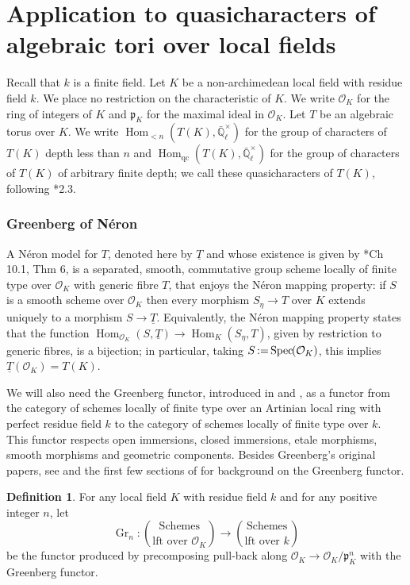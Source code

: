 \documentclass[11pt]{amsart}
\theoremstyle{plain}
\theoremstyle{definition}
\newtheorem{definition}[theorem]{Definition}
\theoremstyle{remark}
\newcommand{\Spec}[1]{{\operatorname{Spec}\hskip-1pt( #1 )}}
\newcommand{\EE}{\mathbb{\bar Q}_\ell}
\newcommand{\OK}{\mathcal{O}_K}
\newcommand{\pK}{\mathfrak{p}_K}
\newcommand{\Fq}{k}
\newcommand{\EEx}{\EE^\times}
\DeclareMathOperator{\Hom}{Hom}
\DeclareMathOperator{\Gr}{Gr}
\newcommand{\ceq}{{\, :=\, }}
\newcommand{\TT}{\underline{T}}
\newcommand{\partop}[2]{\genfrac{(}{)}{0pt}{0}{#1}{#2}}
\begin{document}
\part{Application to quasicharacters of algebraic tori over local fields}

Recall that $\Fq$ is a finite field.
Let $K$ be a non-archimedean local field with residue field $\Fq$.
We place no restriction on the characteristic of $K$. 
We write $\OK$ for the ring of integers of $K$ and $\pK$ for the maximal ideal in $\OK$. 
Let $T$ be an algebraic torus over $K$.
We write $\Hom_{< n}(T(K),\EEx)$ for the group of characters of $T(K)$ depth less than $n$ 
and $\Hom_{\text{qc}}(T(K),\EEx)$ for the group of characters of $T(K)$ of arbitrary finite depth;
we call these quasicharacters of $T(K)$, following \cite{tate:67a}*{2.3}.

\section{Greenberg of N\'eron}
\label{sec:GN}

A N\'eron model for $T$, denoted here by $\TT$ 
and whose existence is given by \cite{bosch-lutkebohmert-reynaud:NeronModels}*{Ch 10.1, Thm 6},
is a separated, smooth, commutative group scheme locally of finite type over $\OK$ with generic fibre $T$,
that enjoys the N\'eron mapping property:
if $S$ is a smooth scheme over $\OK$ then every morphism $S_\eta \to T$
over $K$ extends uniquely to a morphism $S \to \TT$. 
Equivalently, the
N\'eron mapping property states that the function
$\Hom_{\OK} (S,\TT) \to \Hom_K(S_\eta,T)$, given by restriction to
generic fibres, is a bijection; 
in particular, taking $S \ceq \Spec{\OK}$, this implies $\TT(\OK) = T(K)$.

We will also need the Greenberg functor, 
introduced in \cite{greenberg:61} and \cite{greenberg:63a}, 
as a functor from the category of schemes locally of finite type 
over an Artinian local ring with perfect residue field $k$ 
to the category of schemes locally of finite type over $k$. 
This functor respects open immersions, closed immersions, 
etale morphisms, smooth morphisms and geometric components.
Besides Greenberg's original papers, see
and the first few sections of \cite{stasinski:12a} 
for background on the Greenberg functor. 

\begin{definition}\label{def:Grn}
For any local field $K$ with residue field $\Fq$ and for any positive integer $n$, let
\[
\Gr_n : \partop{\text{Schemes}}{\text{lft over $\OK$}} \to \partop{\text{Schemes}}{\text{lft over $\Fq$}}
\]
be the functor produced by precomposing pull-back along $\OK \to \OK/\pK^n$ with the Greenberg functor.
\end{definition}
\end{document}
